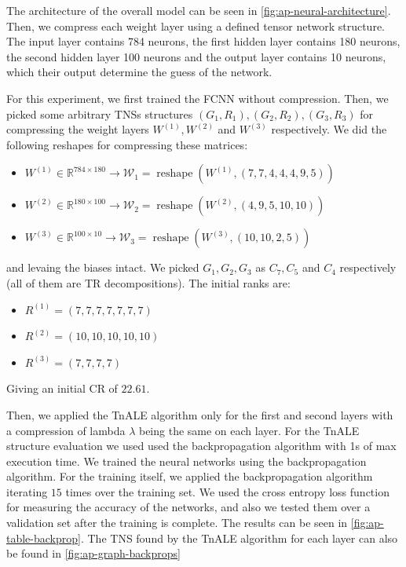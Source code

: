 \documentclass[11pt,a4paper,openright,oneside]{book}
\numberwithin{equation}{section}
\newcommand{\figref}[1]{\cref{#1}}
\DeclareMathOperator{\reshape}{reshape}
\begin{document}
{The architecture of the overall model can be seen in \ref{fig:ap-neural-architecture}. Then, we compress each weight
layer using a defined tensor network structure. The input layer contains 784 neurons, the first hidden layer
contains 180 neurons, the second hidden layer 100 neurons and the output layer contains 10 neurons, which their output
determine the guess of the network.

For this experiment, we first trained the FCNN without compression. Then, we picked some arbitrary
TNSs structures $(G_1, R_1), (G_2, R_2), (G_3, R_3)$ for compressing the weight layers $W^{(1)}, W^{(2)}$ and $W^{(3)}$
respectively. We did the following reshapes for compressing these matrices:
\begin{itemize}
    \item $W^{(1)} \in \mathbb{R}^{784 \times 180} \rightarrow \mathcal{W}_1 = \reshape(W^{(1)}, (7,7,4,4,4,9,5))$
    \item $W^{(2)} \in \mathbb{R}^{180 \times 100} \rightarrow \mathcal{W}_2 = \reshape(W^{(2)}, (4,9,5,10,10))$
    \item $W^{(3)} \in \mathbb{R}^{100 \times 10} \rightarrow \mathcal{W}_3 = \reshape(W^{(3)}, (10,10,2,5))$
\end{itemize}

and levaing the biases intact. We picked $G_1, G_2, G_3$ as $C_7, C_5$ and $C_4$ respectively (all of them are \gls{TR} decompositions). The initial ranks
are:

\begin{itemize}
    \item $R^{(1)} = (7,7,7,7,7,7,7)$
    \item $R^{(2)} = (10,10,10,10,10)$
    \item $R^{(3)} = (7,7,7,7)$
\end{itemize}
Giving an initial \gls{CR} of $22.61$.

Then, we applied the \gls{TnALE} algorithm only for the first and second layers with a compression of lambda $\lambda$ being the same on each layer. For the
\gls{TnALE} structure evaluation we used used the backpropagation algorithm with 1s of max execution time. 
We trained the neural networks using the backpropagation algorithm. For the training itself,
we applied the backpropagation algorithm iterating $15$ times
over the training set. We used the cross entropy loss function for measuring the accuracy of the networks, and also
we tested them over a validation set after the training is complete. The results can be seen in \figref{fig:ap-table-backprop}.
The TNS found by the TnALE algorithm for each layer can also be found in \figref{fig:ap-graph-backprops}

}
\end{document}
